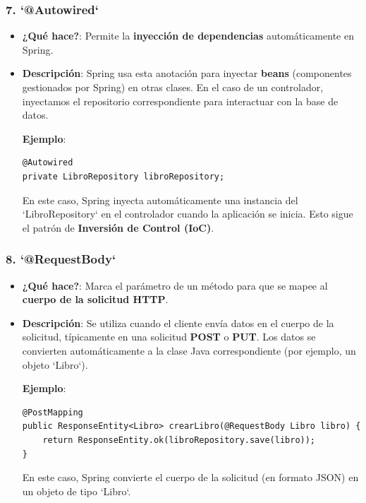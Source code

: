 \documentclass[11pt]{article}
\begin{document}
\subsubsection{7. \textbf{\textbf{`@Autowired`}}}
\label{sec:org3e5ea38}
\begin{itemize}
\item \textbf{\textbf{¿Qué hace?}}: Permite la \textbf{\textbf{inyección de dependencias}} automáticamente en Spring.
\item \textbf{\textbf{Descripción}}: Spring usa esta anotación para inyectar \textbf{\textbf{beans}} (componentes gestionados por Spring) en otras clases. En el caso de un controlador, inyectamos el repositorio correspondiente para interactuar con la base de datos.

\textbf{\textbf{Ejemplo}}:
\begin{verbatim}
@Autowired
private LibroRepository libroRepository;
\end{verbatim}

En este caso, Spring inyecta automáticamente una instancia del `LibroRepository` en el controlador cuando la aplicación se inicia. Esto sigue el patrón de \textbf{\textbf{Inversión de Control (IoC)}}.
\end{itemize}

\subsubsection{8. \textbf{\textbf{`@RequestBody`}}}
\label{sec:orga775a59}
\begin{itemize}
\item \textbf{\textbf{¿Qué hace?}}: Marca el parámetro de un método para que se mapee al \textbf{\textbf{cuerpo de la solicitud HTTP}}.
\item \textbf{\textbf{Descripción}}: Se utiliza cuando el cliente envía datos en el cuerpo de la solicitud, típicamente en una solicitud \textbf{\textbf{POST}} o \textbf{\textbf{PUT}}. Los datos se convierten automáticamente a la clase Java correspondiente (por ejemplo, un objeto `Libro`).

\textbf{\textbf{Ejemplo}}:
\begin{verbatim}
@PostMapping
public ResponseEntity<Libro> crearLibro(@RequestBody Libro libro) {
    return ResponseEntity.ok(libroRepository.save(libro));
}
\end{verbatim}

En este caso, Spring convierte el cuerpo de la solicitud (en formato JSON) en un objeto de tipo `Libro`.
\end{itemize}
\end{document}
